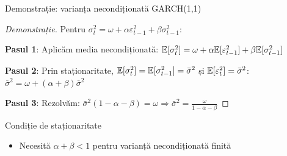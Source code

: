\documentclass[9pt, aspectratio=169, t]{beamer}
\begin{document}
\begin{frame}{Demonstrație: varianța necondiționată GARCH(1,1)}
    \small
    \begin{proof}[Demonstrație]
        Pentru $\sigma_t^2 = \omega + \alpha \varepsilon_{t-1}^2 + \beta \sigma_{t-1}^2$:

        \textbf{Pasul 1}: Aplicăm media necondiționată:
        $\mathbb{E}[\sigma_t^2] = \omega + \alpha \mathbb{E}[\varepsilon_{t-1}^2] + \beta \mathbb{E}[\sigma_{t-1}^2]$

        \textbf{Pasul 2}: Prin staționaritate, $\mathbb{E}[\sigma_t^2] = \mathbb{E}[\sigma_{t-1}^2] = \bar{\sigma}^2$ și $\mathbb{E}[\varepsilon_t^2] = \bar{\sigma}^2$:
        $\bar{\sigma}^2 = \omega + (\alpha + \beta) \bar{\sigma}^2$

        \textbf{Pasul 3}: Rezolvăm: $\bar{\sigma}^2 (1 - \alpha - \beta) = \omega \Rightarrow \boxed{\bar{\sigma}^2 = \frac{\omega}{1 - \alpha - \beta}}$
    \end{proof}
    \vspace{-0.1cm}
    \begin{alertblock}{Condiție de staționaritate}
        \begin{itemize}
            \item Necesită $\alpha + \beta < 1$ pentru varianță necondiționată finită
        \end{itemize}
    \end{alertblock}
\end{frame}
\end{document}
